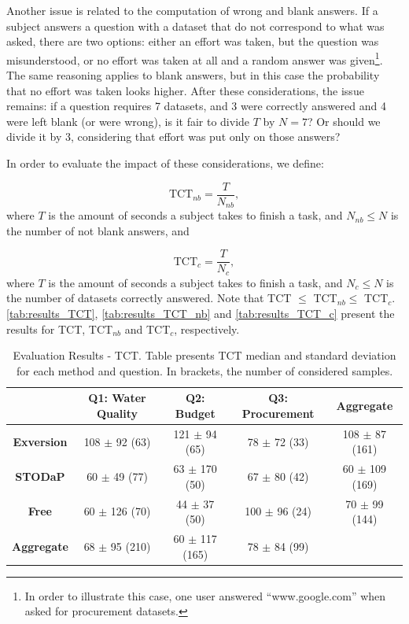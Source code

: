 Another issue is related to the computation of wrong and blank answers.
If a subject answers a question with a dataset that do not correspond to what was asked, there are two options: either an effort was taken, but the question was misunderstood, or no effort was taken at all and a random answer was given\footnote{In order to illustrate this case, one user answered ``www.google.com'' when asked for procurement datasets.}.
The same reasoning applies to blank answers, but in this case the probability that no effort was taken looks higher.
After these considerations, the issue remains: if a question requires 7 datasets, and 3 were correctly answered and 4 were left blank (or were wrong), is it fair to divide $T$ by $N=7$? Or should we divide it by 3, considering that effort was put only on those answers?

In order to evaluate the impact of these considerations, we define:

\begin{equation}
	\textrm{TCT}_{nb} = \frac{T}{N_{nb}},
\end{equation}
where $T$ is the amount of seconds a subject takes to finish a task, and $N_{nb} \leq N$ is the number of not blank answers, and 

\begin{equation}
	\textrm{TCT}_{c} = \frac{T}{N_c},
\end{equation}
where $T$ is the amount of seconds a subject takes to finish a task, and $N_c \leq N$ is the number of datasets correctly answered.
Note that TCT $\leq$ TCT$_{nb} \leq $ TCT$_{c}$.
\autoref{tab:results_TCT}, \autoref{tab:results_TCT_nb} and \autoref{tab:results_TCT_c} present the results for TCT, TCT$_{nb}$ and TCT$_{c}$, respectively.

\begin{table}[h]
\ABNTEXfontereduzida
\centering
\caption[Evaluation Results - TCT.]{Evaluation Results - TCT. Table presents TCT median and standard deviation for each method and question. In brackets, the number of considered samples.}
\label{tab:results_TCT}
\begin{tabular}{|>{\bfseries}c|c|c|c|c|}
\hline
 	& \bfseries{Q1: Water Quality} 	& \bfseries{Q2: Budget} 	& \bfseries{Q3: Procurement} 	& \bfseries{Aggregate} \\ \hline
Exversion 	& 108 $\pm$ 92 (63) 	& 121 $\pm$ 94 (65) 	& 78 $\pm$ 72 (33) 	& 108 $\pm$ 87 (161) \\ \hline
STODaP 	& 60 $\pm$ 49 (77) 	& 63 $\pm$ 170 (50) 	& 67 $\pm$ 80 (42) 	& 60 $\pm$ 109 (169) \\ \hline
Free 	& 60 $\pm$ 126 (70) 	& 44 $\pm$ 37 (50) 	& 100 $\pm$ 96 (24) 	& 70 $\pm$ 99 (144) \\ \hline
Aggregate & 68 $\pm$ 95 (210) 	& 60 $\pm$ 117 (165) 	& 78 $\pm$ 84 (99) 	& \\ \hline 
\end{tabular}
\end{table}


